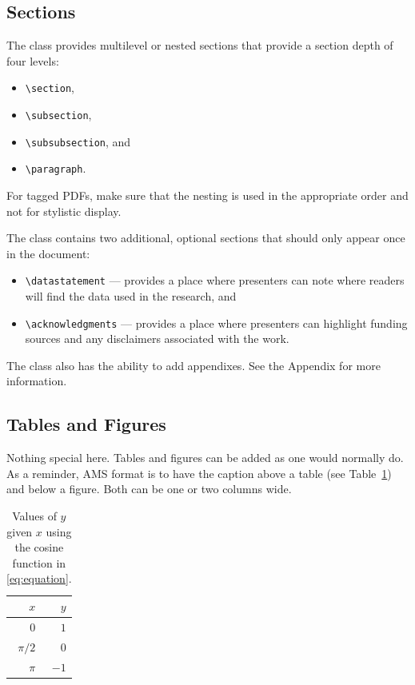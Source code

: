 \documentclass[9pt, blue]{ametsocextabs}
\begin{document}
\subsection{Sections}
The class provides multilevel or nested sections that provide
a section depth of four levels:
\begin{itemize}
    \item \texttt{\textbackslash section},
    \item \texttt{\textbackslash subsection},
    \item \texttt{\textbackslash subsubsection}, and
    \item \texttt{\textbackslash paragraph}.
\end{itemize}
For tagged PDFs, make sure that the nesting is used in the
appropriate order and not for stylistic display.

The class contains two additional, optional sections that should
only appear once in the document:
\begin{itemize}
    \item \texttt{\textbackslash datastatement} ---
        provides a place where presenters can note where readers will
        find the data used in the research, and
    \item \texttt{\textbackslash acknowledgments} ---
        provides a place where presenters can highlight funding sources
        and any disclaimers associated with the work.
\end{itemize}

The class also has the ability to add appendixes. See the Appendix
for more information.

\subsection{Tables and Figures}
Nothing special here. Tables and figures can be added as one would
normally do. As a reminder, AMS format is to have the caption above
a table (see Table~\ref{tab:cos}) and below a figure. Both can be one
or two columns wide.

\begin{table}
    \caption{Values of $y$ given $x$ using the cosine function in \eqref{eq:equation}.}\label{tab:cos}
    \begin{center}
        \begin{tabular}{rr}
            \hline\hline
            $x$ & $y$\\
            \hline
            $0$ & $1$ \\
            $\pi/2$ & $0$ \\
            $\pi$ & $-1$ \\
            \hline
        \end{tabular}
    \end{center}
\end{table}
\end{document}
